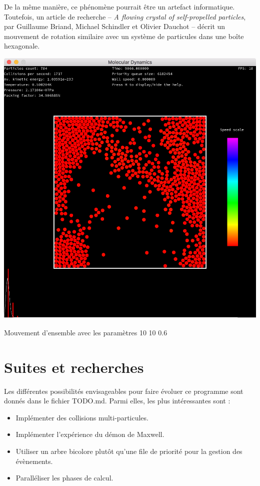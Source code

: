 \documentclass{tufte-handout}
\begin{document}
  De la même manière, ce phénomène pourrait être un artefact informatique. Toutefois, un article de recherche -- \textit{A flowing crystal of self-propelled particles}, par Guillaume Briand, Michael Schindler et Olivier Dauchot -- décrit un mouvement de rotation similaire avec un système de particules dans une boîte hexagonale.
  \begin{marginfigure}
    \includegraphics[width=\linewidth]{figures/rotation.png}
    \caption{Mouvement d'ensemble avec les paramètres 10 10 0.6}
  \end{marginfigure}

  \section{Suites et recherches}
  Les différentes possibilités envisageables pour faire évoluer ce programme sont donnés dans le fichier TODO.md. Parmi elles, les plus intéressantes sont :
  \begin{itemize}
    \item Implémenter des collisions multi-particules.

    \item Implémenter l'expérience du démon de Maxwell.

    \item Utiliser un arbre bicolore plutôt qu'une file de priorité pour la gestion des évènements.

    \item Paralléliser les phases de calcul.
  \end{itemize}

  
  
\end{document}
